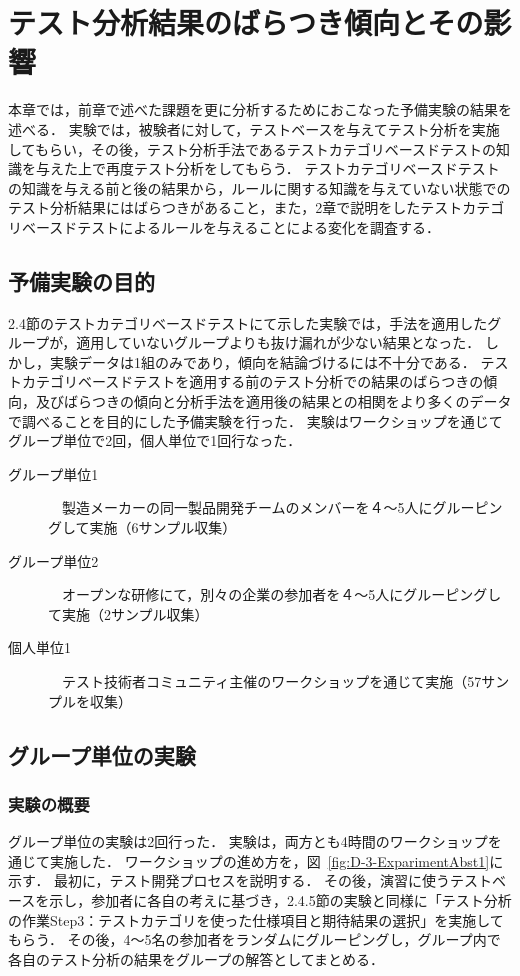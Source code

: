 \chapter{テスト分析結果のばらつき傾向とその影響}\label{chap:3}
本章では，前章で述べた課題を更に分析するためにおこなった予備実験の結果を述べる．
実験では，被験者に対して，テストベースを与えてテスト分析を実施してもらい，その後，テスト分析手法であるテストカテゴリベースドテストの知識を与えた上で再度テスト分析をしてもらう．
テストカテゴリベースドテストの知識を与える前と後の結果から，ルールに関する知識を与えていない状態でのテスト分析結果にはばらつきがあること，また，2章で説明をしたテストカテゴリベースドテストによるルールを与えることによる変化を調査する．

\newpage
\section{予備実験の目的} \label{sec:3-1}
2.4節のテストカテゴリベースドテストにて示した実験では，手法を適用したグループが，適用していないグループよりも抜け漏れが少ない結果となった．
しかし，実験データは1組のみであり，傾向を結論づけるには不十分である．
テストカテゴリベースドテストを適用する前のテスト分析での結果のばらつきの傾向，及びばらつきの傾向と分析手法を適用後の結果との相関をより多くのデータで調べることを目的にした予備実験を行った．
実験はワークショップを通じてグループ単位で2回，個人単位で1回行なった．
\begin{description}
  \item[グループ単位1]　製造メーカーの同一製品開発チームのメンバーを４〜5人にグルーピングして実施（6サンプル収集）
  \item[グループ単位2]　オープンな研修にて，別々の企業の参加者を４〜5人にグルーピングして実施（2サンプル収集）
  \item[個人単位1]　テスト技術者コミュニティ主催のワークショップを通じて実施（57サンプルを収集）
\end{description}

\newpage
\section{グループ単位の実験}
\subsection{実験の概要}
グループ単位の実験は2回行った\cite{yumoto2014}．
実験は，両方とも4時間のワークショップを通じて実施した．
ワークショップの進め方を，図~\ref{fig:D-3-ExparimentAbst1}に示す．
最初に，テスト開発プロセスを説明する．
その後，演習に使うテストベースを示し，参加者に各自の考えに基づき，2.4.5節の実験と同様に「テスト分析の作業Step3：テストカテゴリを使った仕様項目と期待結果の選択」を実施してもらう．
その後，4〜5名の参加者をランダムにグルーピングし，グループ内で各自のテスト分析の結果をグループの解答としてまとめる．


